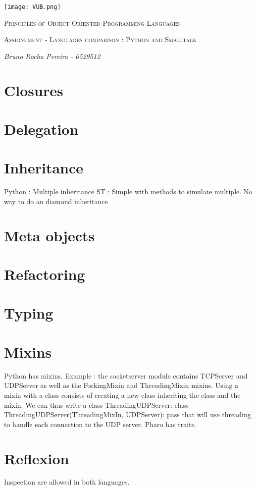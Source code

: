 \documentclass[12pt,a4paper,twocolumn]{scrartcl}
\begin{document}
\begin{titlepage}
    \centering
    \texttt{[image: VUB.png]}\par\vspace{1cm}
    {\scshape\Large Principles of Object-Oriented Programming Languages\par}
    \vspace{1cm}
    {\scshape\Large Assignement - Languages comparison : Python and Smalltalk\par}
    \vspace{1.5cm}
    {\Large\itshape Bruno Rocha Pereira - 0529512\par}
    \vfill
\end{titlepage}

\section{Closures}
\section{Delegation}
\section{Inheritance}
Python : Multiple inheritance
ST : Simple with methods to simulate multiple. No way to do an diamond inheritance
\section{Meta objects}
\section{Refactoring}
\section{Typing}
\section{Mixins}
Python has mixins.
Example : the socketserver module contains TCPServer and UDPServer as well as the ForkingMixin and ThreadingMixin mixins. Using a mixin with a class consists of creating a new class inheriting the class and the mixin. We can thus write a class ThreadingUDPServer:
class ThreadingUDPServer(ThreadingMixIn, UDPServer): pass
that will use threading to handle each connection to the UDP server.
Pharo has traits.
\section{Reflexion}
Inspection are allowed in both languages. 
\end{document}
